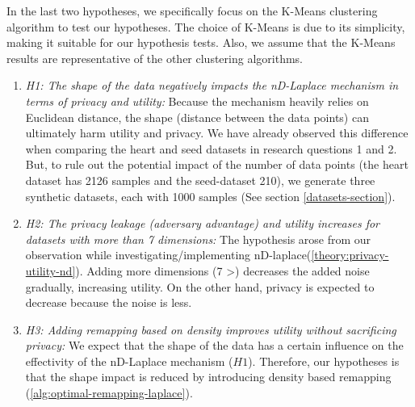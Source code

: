 \begin{enumerate}
          In the last two hypotheses, we specifically focus on the K-Means clustering algorithm to test our hypotheses.
          The choice of K-Means is due to its simplicity, making it suitable for our hypothesis tests.
          Also, we assume that the K-Means results are representative of the other clustering algorithms.
          \begin{enumerate}
              \item \textit{H1: The shape of the data negatively impacts the nD-Laplace mechanism in terms of privacy and utility:}
                    Because the mechanism heavily relies on Euclidean distance, the shape (distance between the data points) can ultimately harm utility and privacy.
                    We have already observed this difference when comparing the heart and seed datasets in research questions 1 and 2.
                    But, to rule out the potential impact of the number of data points (the heart dataset has 2126 samples and the seed-dataset 210), we generate three synthetic datasets, each with 1000 samples (See section \ref{datasets-section}).
              \item \textit{H2: The privacy leakage (adversary advantage) and utility increases for datasets with more than 7 dimensions:}
                    The hypothesis arose from our observation while investigating/implementing nD-laplace(\ref{theory:privacy-utility-nd}).
                    Adding more dimensions (7 >) decreases the added noise gradually, increasing utility.
                    On the other hand, privacy is expected to decrease because the noise is less.
              \item \textit{H3: Adding remapping based on density improves utility without sacrificing privacy:}
                    We expect that the shape of the data has a certain influence on the effectivity of the nD-Laplace mechanism ($H1$).
                    Therefore, our hypotheses is that the shape impact is reduced by introducing density based remapping (\ref{alg:optimal-remapping-laplace}).
          \end{enumerate}
\end{enumerate}
\newpage
